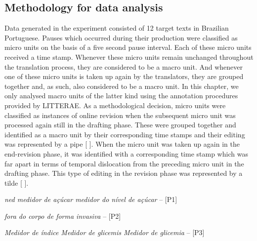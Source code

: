 \documentclass[output=paper]{LSP/langsci}
\begin{document}
\subsection{Methodology for data analysis}\label{sec:alves:3.2}

Data generated in the experiment consisted of 12 target texts in Brazilian Portuguese. Pauses which occurred during their production were classified as micro units on the basis of a five second pause interval. Each of these micro units received a time stamp. Whenever these micro units remain unchanged throughout the translation process, they are considered to be a macro unit. And whenever one of these micro units is taken up again by the translators, they are grouped together and, as such, also considered to be a macro unit. In this chapter, we only analysed macro units of the latter kind using the annotation procedures provided by LITTERAE. As a methodological decision, micro units were classified as instances of online revision when the subsequent micro unit was processed again still in the drafting phase. These were grouped together and identified as a macro unit by their corresponding time stamps and their editing was represented by a pipe [ {\textbar} ]. When the micro unit was taken up again in the end-revision phase, it was identified with a corresponding time stamp which was far apart in terms of temporal dislocation from the preceding micro unit in the drafting phase. This type of editing in the revision phase was represented by a tilde [ {\Tilde} ]. 

\ea \label{ex:alves:1}
\textit{ned {\textbar} medidor de açúcar {\textbar} medidor do nível de açúcar }-- [P1]
\z

\ea \label{ex:alves:2}
\textit{fora do corpo {\Tilde} de forma invasiva }-- [P2]
\z

\ea \label{ex:alves:3}
\textit{Medidor de índice {\textbar} Medidor de glicemis {\Tilde} Medidor de glicemia }-- [P3]
\z
\end{document}
